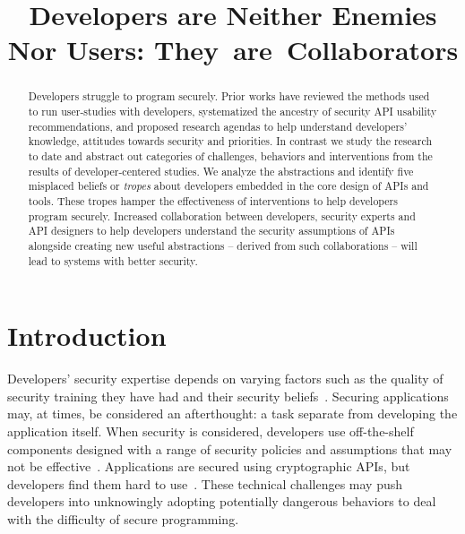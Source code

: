 \documentclass[conference]{IEEEtran}
\begin{document}
\title{Developers are Neither Enemies Nor Users: They~are~Collaborators} 
\author{
}

\maketitle

\begin{abstract}
 Developers struggle to program securely. Prior works have reviewed the methods used to run user-studies with developers, systematized the ancestry of security API usability recommendations, and proposed research agendas to help understand developers' knowledge, attitudes towards security and priorities. In contrast we study the research to date and abstract out categories of challenges, behaviors and interventions from the results of developer-centered studies. We analyze the abstractions and identify five misplaced beliefs or \emph{tropes} about developers embedded in the core design of APIs and tools. These tropes hamper the effectiveness of  interventions to help developers program securely. Increased collaboration between developers, security experts and API designers to help developers understand the security assumptions of APIs alongside creating new useful abstractions -- derived from such collaborations -- will lead to systems with better security.
\end{abstract}

\section{Introduction}

Developers' security expertise depends on varying factors such as the quality of security training they have had and their security beliefs~\cite{oltrogge2018rise}. Securing applications may, at times, be considered an afterthought: a task separate from developing the application itself. When security is considered, developers use off-the-shelf components designed with a range of security policies and assumptions that may not be effective~\cite{tahaei2019,aside2012,acar2016}. Applications are secured using cryptographic APIs, but developers find them hard to use~\cite{smithgreen2016, tahaei2019, acar2016}. These technical challenges may push developers into unknowingly adopting potentially dangerous behaviors to deal with the difficulty of secure programming. 
\end{document}
